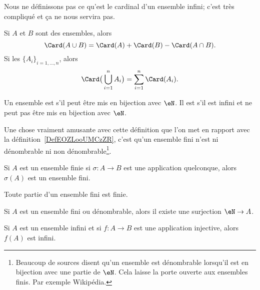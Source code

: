 Nous ne définissons pas ce qu'est le cardinal d'un ensemble infini; c'est très compliqué et ça ne nous servira pas.

\begin{lemma}       \label{LEMooIAMKooLDucJc}
    Si \( A\) et \( B\) sont des ensembles, alors
    \begin{equation}
        \Card(A\cup B)=\Card(A)+\Card(B)-\Card(A\cap B).
    \end{equation}
    Si les \( \{ A_i \}_{i=1,\ldots, n}\), alors
    \begin{equation}
        \Card\big( \bigcup_{i=1}^nA_i \big)=\sum_{i=1}^n\Card(A_i).
    \end{equation}
\end{lemma}

\begin{definition}\label{DefEnsembleDenombrable}
    Un ensemble est  s'il peut être mis en bijection avec \( \eN\). Il est  s'il est infini et ne peut pas être mis en bijection avec \( \eN\).
\end{definition}
Une chose vraiment amusante avec cette définition que l'on met en rapport avec la définition~\ref{DefEOZLooUMCzZR}, c'est qu'un ensemble fini n'est ni dénombrable ni non dénombrable\footnote{Beaucoup de sources disent qu'un ensemble est dénombrable lorsqu'il est en bijection avec une partie de \( \eN\). Cela laisse la porte ouverte aux ensembles finis. Par exemple Wikipédia\cite{ooLMVKooUiQUtb}.}.

\begin{lemma}       \label{LEMooGRGFooSWDeMA}
    Si \( A\) est un ensemble finie si \( \sigma\colon A\to B\) est une application quelconque, alors \( \sigma(A)\) est un ensemble fini.
\end{lemma}

\begin{lemma}       \label{LEMooTUIRooEXjfDY}
    Toute partie d'un ensemble fini est finie.
\end{lemma}

\begin{lemma}       \label{LEMooSRZWooASgEfy}
    Si \( A\) est un ensemble fini ou dénombrable, alors il existe une surjection \( \eN\to A\).
\end{lemma}

\begin{lemma}        \label{LEMooXPSQooRaSrxv}
    Si \( A\) est un ensemble infini et si \( f\colon A\to B\) est une application injective, alors \( f(A)\) est infini.
\end{lemma}

